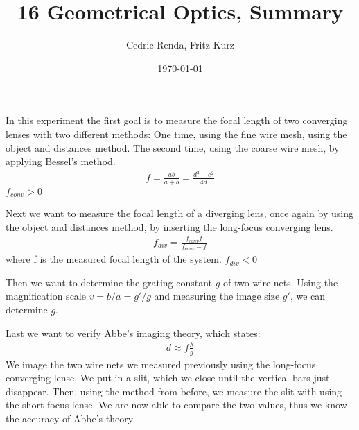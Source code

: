 \documentclass[12pt,a4paper]{article}
\title{16 Geometrical Optics, Summary}
\author{Cedric Renda, Fritz Kurz}
\date{\today }
\begin{document}
In this experiment the first goal is to measure the focal length of two converging lenses with two different methods:
One time, using the fine wire mesh, using the object and distances method.
The second time, using the coarse wire mesh, by applying Bessel's method.
\begin{align}
	f = \frac{a b}{a+b} = \frac{d^2 - e^2}{4 d}
\end{align}
$f_{conv} > 0$


Next we want to measure the focal length of a diverging lens, once again by using the object and distances method, by inserting the long-focus converging lens.
\begin{align}
	f_{div} = \frac{f_{conv} f}{f_{conv}-f}
\end{align}
where f is the measured focal length of the system. $f_{div} < 0$

Then we want to determine the grating constant $g$ of two wire nets.
Using the magnification scale $v = b/a = g'/g$ and measuring the image size $g'$, we can determine $g$.

Last we want to verify Abbe's imaging theory, which states:
\begin{align}
	d \approx f \frac{\lambda}{g}
\end{align}
We image the two wire nets we measured previously using the long-focus converging lense.
We put in a slit, which we close until the vertical bars just disappear. 
Then, using the method from before, we measure the slit with using the short-focus lense.
We are now able to compare the two values, thus we know the accuracy of Abbe's theory
\end{document}
